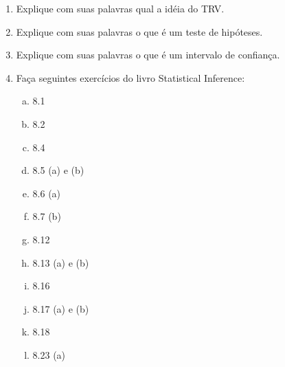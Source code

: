 \documentclass[10pt,brazil,addpoints]{exam}
\begin{document}
\begin{enumerate}[1.]
\item Explique com suas palavras qual a idéia do TRV.

\item Explique com suas palavras o que é um teste de hipóteses.

\item Explique com suas palavras o que é um intervalo de confiança.

\item Faça seguintes exercícios do livro Statistical Inference: 

\begin{enumerate}[a)] 

\item 8.1 

\item 8.2

\item 8.4

\item 8.5 (a) e (b)

\item 8.6 (a)

\item 8.7 (b)

\item 8.12

\item 8.13 (a) e (b)

\item 8.16

\item 8.17 (a) e (b)

\item 8.18

\item 8.23 (a)

\end{enumerate}




\end{enumerate}
\end{document}

